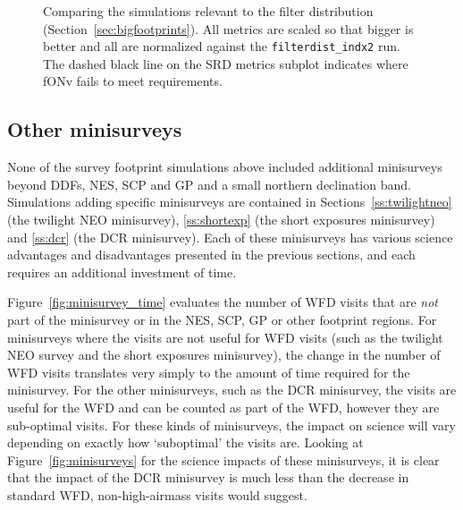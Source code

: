 \begin{figure}
\caption{Comparing the simulations relevant to the filter distribution (Section~\ref{sec:bigfootprints}). All metrics are scaled so that bigger is better and all are normalized against the {\tt filterdist\_indx2}  run. The dashed black line on the SRD metrics subplot indicates where fONv fails to meet requirements.}
\label{fig:filterdist}
\end{figure}



\subsection{Other minisurveys}\label{sec:minisurveys}

None of the survey footprint simulations above included additional minisurveys beyond DDFs, NES, SCP and GP and a small northern declination band. Simulations adding specific minisurveys are contained in Sections~\ref{ss:twilightneo} (the twilight NEO minisurvey), \ref{ss:shortexp} (the short exposures minisurvey) and \ref{ss:dcr} (the DCR minisurvey). Each of these minisurveys has various science advantages and disadvantages presented in the previous sections, and each requires an additional investment of time. 

Figure~\ref{fig:minisurvey_time} evaluates the number of WFD visits that are {\it not} part of the minisurvey or in the NES, SCP, GP or other footprint regions. For minisurveys where the visits are not useful for WFD visits (such as the twilight NEO survey and the short exposures minisurvey), the change in the number of WFD visits translates very simply to the amount of time required for the minisurvey. For the other minisurveys, such as the DCR minisurvey, the visits are useful for the WFD and can be counted as part of the WFD, however they are sub-optimal visits. For these kinds of minisurveys, the impact on science will vary depending on exactly how `suboptimal' the visits are. Looking at Figure~\ref{fig:minisurveys} for the science impacts of these minisurveys, it is clear that the impact of the DCR minisurvey is much less than the decrease in standard WFD, non-high-airmass visits would suggest. 

